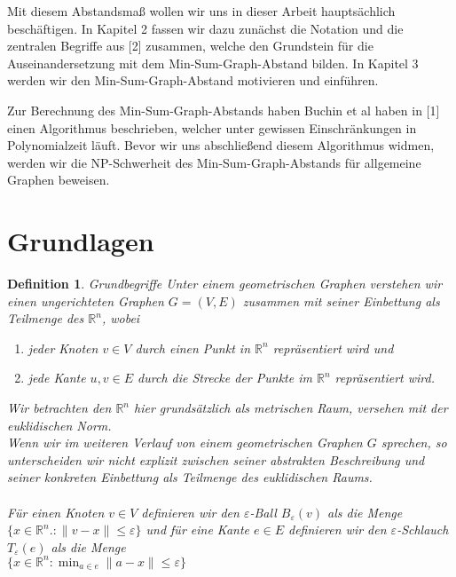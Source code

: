 \documentclass[a4paper, 12pt, twoside]{article}
\theoremstyle{Format1} %
\newtheorem{Def}{Definition}[section]       %
\begin{document}
Mit diesem Abstandsmaß wollen wir uns in dieser Arbeit hauptsächlich beschäftigen.
In Kapitel 2 fassen wir dazu zunächst die Notation und die zentralen Begriffe aus [2] zusammen, welche den Grundstein für die Auseinandersetzung mit dem Min-Sum-Graph-Abstand bilden.
In Kapitel 3 werden wir den Min-Sum-Graph-Abstand motivieren und einführen.

Zur Berechnung des Min-Sum-Graph-Abstands haben Buchin et al haben in [1] einen Algorithmus beschrieben, welcher unter gewissen Einschränkungen in Polynomialzeit läuft.
Bevor wir uns abschließend diesem Algorithmus widmen, werden wir die NP-Schwerheit des Min-Sum-Graph-Abstands für allgemeine Graphen beweisen.
\newpage

\section{Grundlagen}

\begin{Def}
	Grundbegriffe
	Unter einem \textit{geometrischen Graphen} verstehen wir einen ungerichteten Graphen $G=(V, E)$ zusammen mit seiner Einbettung als Teilmenge des $ \mathbb{R}^n $, wobei
    	\begin{enumerate}
		\item[1)] jeder Knoten $v \in V $ durch einen Punkt in $ \mathbb{R}^n $ repräsentiert wird und
		\item[2)] jede Kante ${u,v} \in E$ durch die Strecke der Punkte im $ \mathbb{R}^n $ repräsentiert wird.
    	\end{enumerate}

	Wir betrachten den $ \mathbb{R}^n $ hier grundsätzlich als metrischen Raum, versehen mit der euklidischen Norm.
	\\
	Wenn wir im weiteren Verlauf von einem geometrischen Graphen $G$ sprechen, so unterscheiden wir nicht explizit zwischen seiner abstrakten
	Beschreibung und seiner konkreten Einbettung als Teilmenge des euklidischen Raums.
	\\
	\\
	Für einen Knoten $v \in V$ definieren wir den \textit{$\varepsilon$-Ball} $B_{\varepsilon}(v)$ als die Menge
	$\{x \in \mathbb{R}^n.: \|v-x\| \leq \varepsilon\}$
	und für eine Kante $e \in E$ definieren wir den \textit{$\varepsilon$-Schlauch} $T_{\varepsilon}(e)$ als die Menge
	\\
	$\{x \in \mathbb{R}^n: \min_{a \in e}\|a-x\| \leq \varepsilon\}$
\end{Def}
\end{document}
